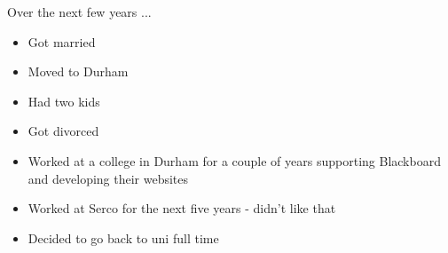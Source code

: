 \begin{frame}
	\vspace{1em}
	Over the next few years ...
	\begin{itemize}
		\item Got married
		\item Moved to Durham
		\item Had two kids
		\item Got divorced
		\item Worked at a college in Durham for a couple of years supporting Blackboard and developing their websites
		\item Worked at Serco for the next five years - didn't like that
		\item Decided to go back to uni full time
	\end{itemize}
	\note{}
\end{frame}
